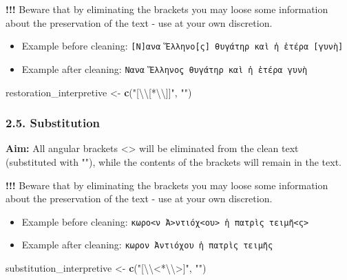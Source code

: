 \documentclass[]{article}
\newenvironment{Shaded}{\begin{snugshade}}{\end{snugshade}}
\newcommand{\CharTok}[1]{\textcolor[rgb]{0.31,0.60,0.02}{#1}}
\newcommand{\KeywordTok}[1]{\textcolor[rgb]{0.13,0.29,0.53}{\textbf{#1}}}
\newcommand{\NormalTok}[1]{#1}
\newcommand{\StringTok}[1]{\textcolor[rgb]{0.31,0.60,0.02}{#1}}
\providecommand{\tightlist}{%
  \setlength{\itemsep}{0pt}\setlength{\parskip}{0pt}}
\begin{document}
\textbf{!!!} Beware that by eliminating the brackets you may loose some
information about the preservation of the text - use at your own
discretion.

\begin{itemize}
\tightlist
\item
  Example before cleaning:
  \texttt{{[}Ν{]}ανα\ Ἕλληνο̣{[}ς{]}\ θυγάτηρ\ καὶ\ ἡ\ ἑτέρα\ {[}γυνὴ{]}}
\item
  Example after cleaning:
  \texttt{Νανα\ Ἕλληνο̣ς\ θυγάτηρ\ καὶ\ ἡ\ ἑτέρα\ γυνὴ}
\end{itemize}

\begin{Shaded}
\begin{Highlighting}[]
\NormalTok{restoration_interpretive <-}\StringTok{ }\KeywordTok{c}\NormalTok{(}\StringTok{"[}\CharTok{\textbackslash{}\textbackslash{}}\StringTok{[*}\CharTok{\textbackslash{}\textbackslash{}}\StringTok{]]"}\NormalTok{, }\StringTok{""}\NormalTok{)}
\end{Highlighting}
\end{Shaded}

\hypertarget{substitution-1}{%
\subsubsection{2.5. Substitution}\label{substitution-1}}

\textbf{Aim:} All angular brackets \textless{}\textgreater{} will be
eliminated from the clean text (substituted with ""), while the contents
of the brackets will remain in the text.

\textbf{!!!} Beware that by eliminating the brackets you may loose some
information about the preservation of the text - use at your own
discretion.

\begin{itemize}
\tightlist
\item
  Example before cleaning:
  \texttt{κωρο\textless{}ν\ Ἀ\textgreater{}ντιόχ\textless{}ου\textgreater{}\ ἡ\ πατρὶς\ τειμῆ\textless{}ς\textgreater{}}
\item
  Example after cleaning: \texttt{κωρον\ Ἀντιόχου\ ἡ\ πατρὶς\ τειμῆς}
\end{itemize}

\begin{Shaded}
\begin{Highlighting}[]
\NormalTok{substitution_interpretive <-}\StringTok{ }\KeywordTok{c}\NormalTok{(}\StringTok{"[}\CharTok{\textbackslash{}\textbackslash{}}\StringTok{<*}\CharTok{\textbackslash{}\textbackslash{}}\StringTok{>]"}\NormalTok{, }\StringTok{""}\NormalTok{)}
\end{Highlighting}
\end{Shaded}
\end{document}
